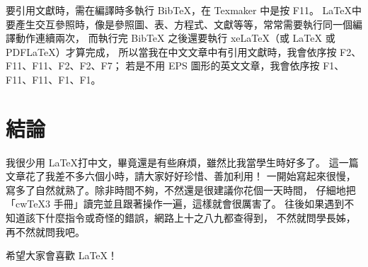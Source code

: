 \documentclass[12pt, a4paper]{article}
\begin{document}
要引用文獻時，需在編譯時多執行 BibTeX，在 Texmaker 中是按 F11。
\LaTeX 中要產生交互參照時，像是參照圖、表、方程式、文獻等等，常常需要執行同一個編譯動作連續兩次，
而執行完 BibTeX 之後還要執行 xeLaTeX（或 LaTeX 或 PDFLaTeX）才算完成，
所以當我在中文文章中有引用文獻時，我會依序按 F2、F11、F11、F2、F2、F7；
若是不用 EPS 圖形的英文文章，我會依序按 F1、F11、F11、F1、F1。










\section{結論}

我很少用 \LaTeX 打中文，畢竟還是有些麻煩，雖然比我當學生時好多了。
這一篇文章花了我差不多六個小時，請大家好好珍惜、善加利用！
一開始寫起來很慢，寫多了自然就熟了。除非時間不夠，不然還是很建議你花個一天時間，
仔細地把「cwTeX3 手冊」讀完並且跟著操作一遍，這樣就會很厲害了。
往後如果遇到不知道該下什麼指令或奇怪的錯誤，網路上十之八九都查得到，
不然就問學長姊，再不然就問我吧。

希望大家會喜歡 \LaTeX！













\end{document}
